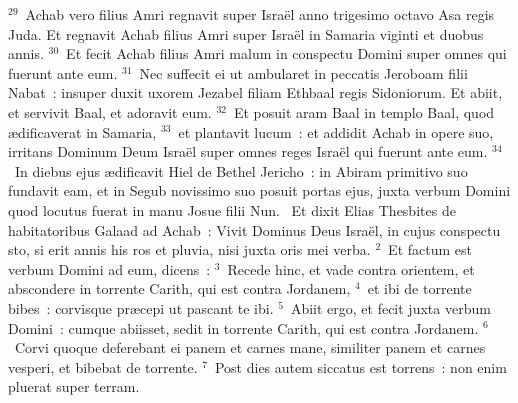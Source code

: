 ${}^{29}$~Achab vero filius Amri regnavit super Isra\"el anno trigesimo octavo Asa regis Juda. Et regnavit Achab filius Amri super Isra\"el in Samaria viginti et duobus annis.
${}^{30}$~Et fecit Achab filius Amri malum in conspectu Domini super omnes qui fuerunt ante eum.
${}^{31}$~Nec suffecit ei ut ambularet in peccatis Jeroboam filii Nabat~: insuper duxit uxorem Jezabel filiam Ethbaal regis Sidoniorum. Et abiit, et servivit Baal, et adoravit eum.
${}^{32}$~Et posuit aram Baal in templo Baal, quod \ae dificaverat in Samaria,
${}^{33}$~et plantavit lucum~: et addidit Achab in opere suo, irritans Dominum Deum Isra\"el super omnes reges Isra\"el qui fuerunt ante eum.
${}^{34}$~In diebus ejus \ae dificavit Hiel de Bethel Jericho~: in Abiram primitivo suo fundavit eam, et in Segub novissimo suo posuit portas ejus, juxta verbum Domini quod locutus fuerat in manu Josue filii Nun.
~Et dixit Elias Thesbites de habitatoribus Galaad ad Achab~: Vivit Dominus Deus Isra\"el, in cujus conspectu sto, si erit annis his ros et pluvia, nisi juxta oris mei verba.
${}^{2}$~Et factum est verbum Domini ad eum, dicens~:
${}^{3}$~Recede hinc, et vade contra orientem, et abscondere in torrente Carith, qui est contra Jordanem,
${}^{4}$~et ibi de torrente bibes~: corvisque pr\ae cepi ut pascant te ibi.
${}^{5}$~Abiit ergo, et fecit juxta verbum Domini~: cumque abiisset, sedit in torrente Carith, qui est contra Jordanem.
${}^{6}$~Corvi quoque deferebant ei panem et carnes mane, similiter panem et carnes vesperi, et bibebat de torrente.
${}^{7}$~Post dies autem siccatus est torrens~: non enim pluerat super terram.



